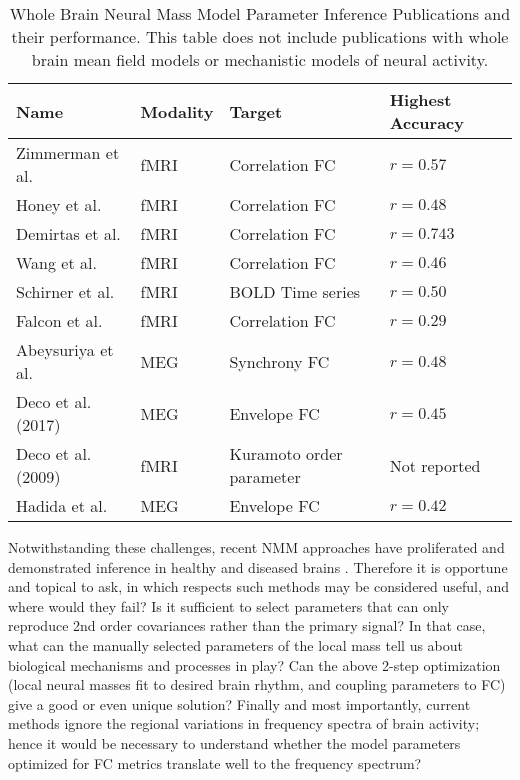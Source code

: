 \begin{table}
 \caption{Whole Brain Neural Mass Model Parameter Inference Publications and their performance. This table does not include publications with whole brain mean field models or mechanistic models of neural activity. }
  \centering
  \begin{tabular}{llll}
    \toprule
    \cmidrule(r){1-2}
    Name & Modality  & Target  & Highest Accuracy \\
    \midrule
    Zimmerman et al. \cite{Zimmermann2018} & fMRI & Correlation FC & $r=0.57$  \\
    Honey et al. \cite{honey_predicting_2009} & fMRI & Correlation FC & $ r=0.48$ \\
    Demirtas et al. \cite{demirtas_hierarchical_2019} & fMRI & Correlation FC & $r=0.743$ \\
    Wang et al. \cite{wang_inversion_2019} & fMRI & Correlation FC & $r=0.46$ \\
    Schirner et al. \cite{schirner_inferring_2018} & fMRI & BOLD Time series & $r=0.50$ \\
    Falcon et al. \cite{falcon_virtual_2015} & fMRI  & Correlation FC  &  $r = 0.29$  \\
    Abeysuriya et al. \cite{abeysuriya_biophysical_2018} & MEG & Synchrony FC & $r = 0.48$ \\
    Deco et al. (2017) \cite{deco_single_2017}  & MEG & Envelope FC & $r=0.45$ \\
    Deco et al. (2009) \cite{Deco2009} & fMRI & Kuramoto order parameter & Not reported \\
    Hadida et al. \cite{hadida_bayesian_2018} & MEG & Envelope FC & $r=0.42$ \\
    \bottomrule
  \end{tabular}
  \label{tab:nmm_pubs}
\end{table}

Notwithstanding these challenges, recent NMM approaches have proliferated and demonstrated inference in healthy and diseased brains \cite{honey_dynamical_2008,alstott_modeling_2009,haan_activity_2012,yang_functional_2016,Zimmermann2018,singh_estimation_2020}. Therefore it is opportune and topical to ask, in which respects such methods may be considered useful, and where would they fail? Is it sufficient to select parameters that can only reproduce 2nd order covariances rather than the primary signal? In that case, what can the manually selected parameters of the local mass tell us about biological mechanisms and processes in play? Can the above 2-step optimization (local neural masses fit to desired brain rhythm, and coupling parameters to FC) give a good or even unique solution? Finally and most importantly, current methods ignore the regional variations in frequency spectra of brain activity; hence it would be necessary to understand whether the model parameters optimized for FC metrics translate well to the frequency spectrum?

